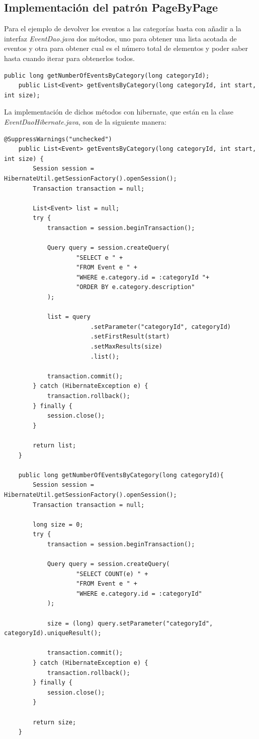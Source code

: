 \documentclass{article}
\begin{document}
\subsection{Implementación del patrón PageByPage}
	Para el ejemplo de devolver los eventos a las categorías basta con añadir a la interfaz \emph{EventDao.java} dos métodos, uno para obtener una lista acotada de eventos y otra para obtener cual es el número total de elementos y poder saber hasta cuando iterar para obtenerlos todos.
\begin{lstlisting}[style=java]
	public long getNumberOfEventsByCategory(long categoryId);
	public List<Event> getEventsByCategory(long categoryId, int start, int size);
\end{lstlisting}

	La implementación de dichos métodos con hibernate, que están en la clase 
\emph{EventDaoHibernate.java}, son de la siguiente manera:
\begin{lstlisting}[style=java]
	@SuppressWarnings("unchecked")
	public List<Event> getEventsByCategory(long categoryId, int start, int size) {
		Session session = HibernateUtil.getSessionFactory().openSession();
    	Transaction transaction = null;
    	
    	List<Event> list = null;
    	try {
    		transaction = session.beginTransaction();
    		
    		Query query = session.createQuery(
    				"SELECT e " +
    				"FROM Event e " +
    				"WHERE e.category.id = :categoryId "+
    				"ORDER BY e.category.description"
    		);
    		
    		list = query
    					.setParameter("categoryId", categoryId)
    					.setFirstResult(start)
    					.setMaxResults(size)
    					.list();
    		
    		transaction.commit();
    	} catch (HibernateException e) {
    		transaction.rollback();
    	} finally {
    		session.close();
    	}
    	
    	return list;
	}
	
	public long getNumberOfEventsByCategory(long categoryId){
		Session session = HibernateUtil.getSessionFactory().openSession();
    	Transaction transaction = null;
    	
    	long size = 0;
    	try {
    		transaction = session.beginTransaction();
    		
    		Query query = session.createQuery(
    				"SELECT COUNT(e) " +
    				"FROM Event e " +
    				"WHERE e.category.id = :categoryId"
    		);
    		
    		size = (long) query.setParameter("categoryId", categoryId).uniqueResult();
    		
    		transaction.commit();
    	} catch (HibernateException e) {
    		transaction.rollback();
    	} finally {
    		session.close();
    	}
    	
    	return size;
	}
\end{lstlisting}
\end{document}
